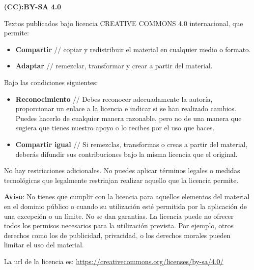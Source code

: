 
\thispagestyle{empty}\sffamily
\begin{flushleft}\scriptsize
\textbf{(CC):BY-SA 4.0}

\vspace{.5\baselineskip}

Textos publicados bajo licencia CREATIVE COMMONS 4.0 internacional, que permite:

\begin{itemize}
\item \textbf{Compartir} // copiar y redistribuir el material en cualquier medio o formato.
\item \textbf{Adaptar} // remezclar, transformar y crear a partir del material.
\end{itemize}

Bajo las condiciones siguientes:

\begin{itemize}
\item \textbf{Reconocimiento} // Debes reconocer adecuadamente la autoría, proporcionar un enlace a la licencia e indicar si se han realizado cambios. Puedes hacerlo de cualquier manera razonable, pero no de una manera que sugiera que tienes nuestro apoyo o lo recibes por el uso que haces.
\item \textbf{Compartir igual} // Si remezclas, transformas o creas a partir del material, deberás difundir sus contribuciones bajo la misma licencia que el original.
\end{itemize}

No hay restricciones adicionales. No puedes aplicar términos legales o medidas tecnológicas que legalmente restrinjan realizar aquello que la licencia permite.

\vspace{1.0\baselineskip}

\textbf{Aviso}: No tienes que cumplir con la licencia para aquellos elementos del material en el dominio público o cuando su utilización esté permitida por la aplicación de una excepción o un límite. No se dan garantías. La licencia puede no ofrecer todos los permisos necesarios para la utilización prevista. Por ejemplo, otros derechos como los de publicidad, privacidad, o los derechos morales pueden limitar el uso del material.

\vspace{1.0\baselineskip}

La url de la licencia es: 
\url{https://creativecommons.org/licenses/by-sa/4.0/}


\end{flushleft}
